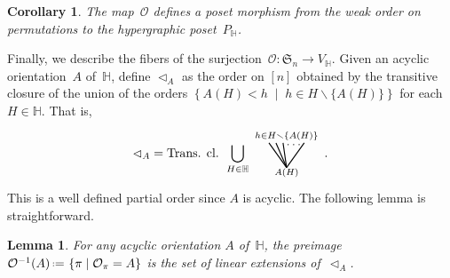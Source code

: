 \documentclass{amsart}
\newtheorem{corollary}[theorem]{Corollary}
\newtheorem{lemma}[theorem]{Lemma}
\theoremstyle{definition}
\newcommand{\set}[2]{\left\{ #1 \;\middle|\; #2 \right\}} %
\newcommand{\ssm}{\smallsetminus} %
\newcommand{\eqdef}{\mbox{\,\raisebox{0.2ex}{\scriptsize\ensuremath{\mathrm:}}\ensuremath{=}\,}} %
\newcommand{\fS}{\mathfrak{S}} %
\newcommand{\less}{\vartriangleleft} %
\newcommand{\Or}{\mathcal O}  %
\newcommand{\HH}{\mathbb H}  %
\begin{document}
\begin{corollary}
\label{coro:weakToP}
The map~$\Or$ defines a poset morphism from the weak order on permutations to the hypergraphic poset~$P_\HH$.
\end{corollary}

\pagebreak
Finally, we describe the fibers of the surjection~$\Or : \fS_n \to V_\HH$.
Given an acyclic orientation~$A$ of~$\HH$, define $\less_A$ as the order on $[n]$ obtained by the transitive closure of the union of the \linebreak orders $\set{A(H) < h}{h \in H \ssm \{A(H)\}}$ for each $H \in \HH$.
That is,
\[ 
	{\less_A} =  \text{Trans. cl. }
	\bigcup_{H \in \HH} 
	\begin{tikzpicture}[scale=1,baseline=.0cm]
		\node at (0,-.45) {$\scriptstyle A(H)$};
		\node at (0,.6) {$\scriptstyle h \in H \ssm \{A(H)\}$};
		\node at (.2,.35) {$\ldots$};
		\draw [thick] (0,-.3)--(-.5,.4); 
		\draw [thick] (0,-.3)--(-.3,.4); 
		\draw [thick] (0,-.3)--(-.1,.4); 
		\draw [thick] (0,-.3)--(.5,.4); 
	\end{tikzpicture} \,.
\]
This is a well defined partial order since $A$ is acyclic.
The following lemma is straightforward.

\begin{lemma}
\label{lem:prepi}
For any acyclic orientation $A$ of~$\HH$, the preimage $\Or^{-1}(A) \eqdef \set{\pi}{\Or_\pi=A}$ is the set of linear extensions of~$\less_A$.
\end{lemma}
\end{document}
